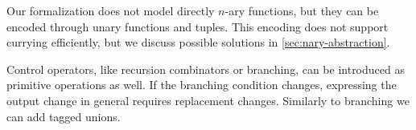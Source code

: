 Our formalization does not model directly $n$-ary functions, but they can be
encoded through unary functions and tuples. This encoding does not support
currying efficiently, but we discuss possible solutions in
\cref{sec:nary-abstraction}.

Control operators, like recursion combinators or branching, can be
introduced as primitive operations as well. If the branching condition changes,
expressing the output change in general requires replacement changes. Similarly
to branching we can add tagged unions.
